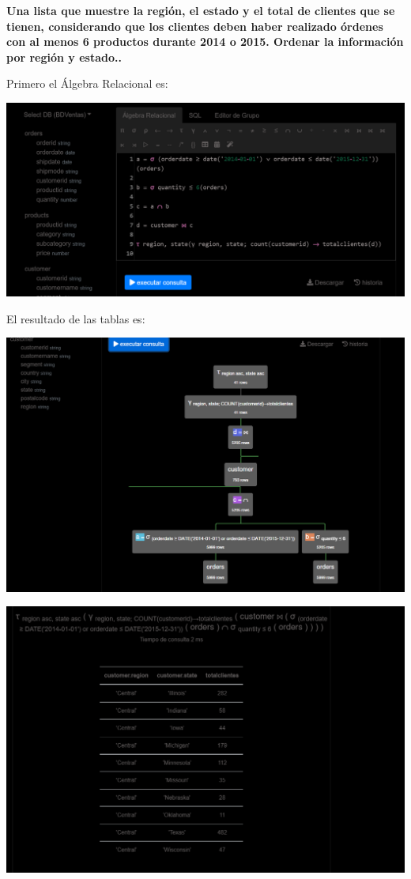 \textbf{Una lista que muestre la región, el estado y el total de clientes que se tienen, considerando que los clientes deben
haber realizado órdenes con al menos 6 productos durante 2014 o 2015. Ordenar la información por región y estado..} \vspace{.3cm}

Primero el Álgebra Relacional es:

\begin{center}
    \includegraphics[width=14cm]{resources/pregunta2/2.6.1.png}
\end{center}


El resultado de las tablas es:

\begin{center}
    \includegraphics[width=14cm]{resources/pregunta2/2.6.2.png}
\end{center}


\begin{center}
    \includegraphics[width=14cm]{resources/pregunta2/2.6.3.png}
\end{center}
